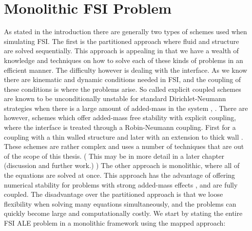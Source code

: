 \section{Monolithic FSI Problem}
As stated in the introduction there are generally two types of schemes used when simulating FSI. The first is the partitioned approach where fluid and structure are solved sequentially.  This approach is appealing in that we have a wealth of knowledge and techniques on how to solve each of these kinds of problems in an efficient manner. The difficulty however is dealing with the interface. As we know there are kinematic and dynamic conditions needed in FSI, and the coupling of these conditions is where the problems arise. So called explicit coupled schemes are known to be unconditionally unstable for standard Dirichlet-Neumann strategies when there is a large amount of added-mass in the system \cite{Fernandez2015}, \cite{VanBrummelen2009}. There are however, schemes which offer added-mass free stability with explicit coupling, where the interface is treated through a Robin-Neumann coupling. First for a coupling with a thin walled structure \cite{Fernandez2013} and later with an extension to thick wall \cite{Fernandez2015}. These schemes are rather complex and uses a number of techniques that are out of the scope of this thesis. ( This may be in more detail in a later chapter (discussion and further work.) ) \newline
The other approach is monolithic, where all of the equations are solved at once. This approach has the advantage of offering numerical stability for problems with strong added-mass effects \cite{Liu2014}, and are fully coupled. The disadvantage over the partitioned approach is that we loose flexibility when solving many equations simultaneously, and the problems can quickly become large and computationally costly. \newline
We start by stating the entire FSI ALE problem in a monolithic framework using the mapped approach: 


